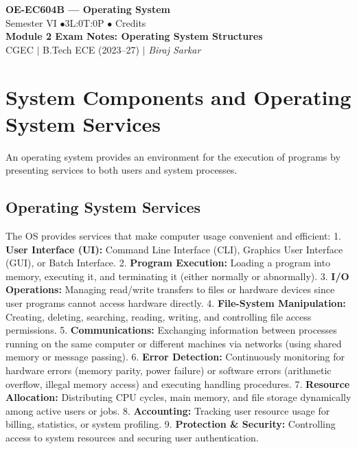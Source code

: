 \documentclass[12pt,a4paper]{article}
\begin{document}

\begin{center}
  {\LARGE\bfseries\color{myred} OE-EC604B --- Operating System}\\[5pt]
  {\normalsize\color{mydark} Semester VI \quad$\bullet$\quad 3L:0T:0P \quad$\bullet$ Credits}\\[3pt]
  {\normalsize\color{myteal}\textbf{Module 2 Exam Notes: Operating System Structures}}\\[3pt]
  {\small\color{mydark} CGEC \;$|$\; B.Tech ECE (2023--27) \;$|$\; \textit{Biraj Sarkar}}
\end{center}
\vspace{2pt}
\noindent{\color{myred}\rule{\linewidth}{1.5pt}}
\vspace{2pt}

\hypersetup{linkcolor=mydark}
\tableofcontents
\hypersetup{linkcolor=myteal}
\newpage

\section{System Components and Operating System Services}

An operating system provides an environment for the execution of programs by presenting services to both users and system processes.

\subsection{Operating System Services}
The OS provides services that make computer usage convenient and efficient:
1. \textbf{User Interface (UI):} Command Line Interface (CLI), Graphics User Interface (GUI), or Batch Interface.
2. \textbf{Program Execution:} Loading a program into memory, executing it, and terminating it (either normally or abnormally).
3. \textbf{I/O Operations:} Managing read/write transfers to files or hardware devices since user programs cannot access hardware directly.
4. \textbf{File-System Manipulation:} Creating, deleting, searching, reading, writing, and controlling file access permissions.
5. \textbf{Communications:} Exchanging information between processes running on the same computer or different machines via networks (using shared memory or message passing).
6. \textbf{Error Detection:} Continuously monitoring for hardware errors (memory parity, power failure) or software errors (arithmetic overflow, illegal memory access) and executing handling procedures.
7. \textbf{Resource Allocation:} Distributing CPU cycles, main memory, and file storage dynamically among active users or jobs.
8. \textbf{Accounting:} Tracking user resource usage for billing, statistics, or system profiling.
9. \textbf{Protection \& Security:} Controlling access to system resources and securing user authentication.
\end{document}
